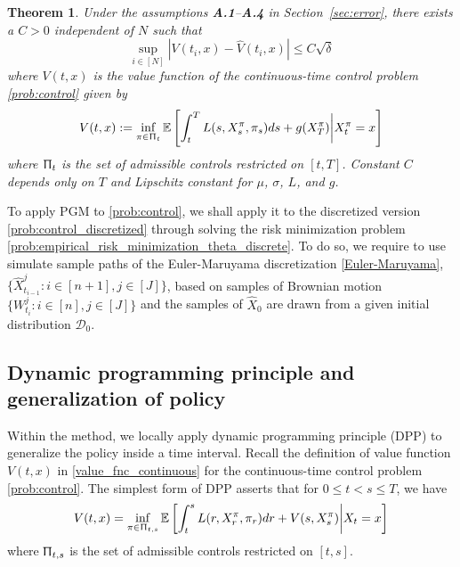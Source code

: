 \documentclass{article}
\newtheorem{theorem}{Theorem}[section]
\numberwithin{equation}{section}
\begin{document}
\begin{theorem}\label{thm:strong_error}
    Under the assumptions \textbf{A.1}--\textbf{A.4} in Section~\ref{sec:error}, there exists a $C>0$ independent of $N$ such that 
    \begin{equation}
        \sup_{i\in[N]}|V(t_{i},x)-\hat{V}(t_{i},x)|\le C\sqrt{\delta}
    \end{equation}
    where $V(t,x)$ is the value function of the continuous-time control problem \eqref{prob:control} given by
    \begin{equation}\label{value_fnc_continuous}
        V(t,x):= \inf_{\pi\in\Uppi_t}\mathbb{E}\left[\int_t^TL(s,X^\pi_s,\pi_s)ds + g(X_T^\pi)\bigg| X^\pi_t=x\right]
    \end{equation}
    where $\Uppi_t$ is the set of admissible controls restricted on $[t,T]$. Constant $C$ depends only on $T$ and Lipschitz constant for $\mu$, $\sigma$, $L$, and $g$. 
\end{theorem}
To apply PGM to \eqref{prob:control}, we shall apply it to the discretized version \eqref{prob:control_discretized} through solving the risk minimization problem \eqref{prob:empirical_risk_minimization_theta_discrete}. To do so, we require to use  simulate sample paths of the Euler-Maruyama discretization \eqref{Euler-Maruyama}, $\{\hat{X}_{t_{i-1}}^j:i\in[n+1],j\in[J]\}$, based on samples of Brownian motion $\{W^j_{t_{i}}:i\in[n],j\in[J]\}$ and the samples of $\hat{X}_0$ are drawn from a given initial distribution $\mathcal{D}_0$. 

\subsection{Dynamic programming principle and generalization of policy}
Within the method, we locally apply dynamic programming principle (DPP) to generalize the policy inside a time interval. Recall the definition of value function $V(t,x)$ in \eqref{value_fnc_continuous} for the continuous-time control problem \eqref{prob:control}. The simplest form of DPP asserts that for $0\le t<s\le T$, we have
  \begin{equation}\label{DPP_continuous}
        V(t,x)= \inf_{\pi\in\Uppi_{t,s}}\mathbb{E}\left[\int_t^sL(r,X^\pi_r,\pi_r)dr + V(s,X_s^\pi)\bigg| X_t=x\right]
    \end{equation}
    where $\Uppi_{t,s}$ is the set of admissible controls restricted on $[t,s]$. 
    
\end{document}
